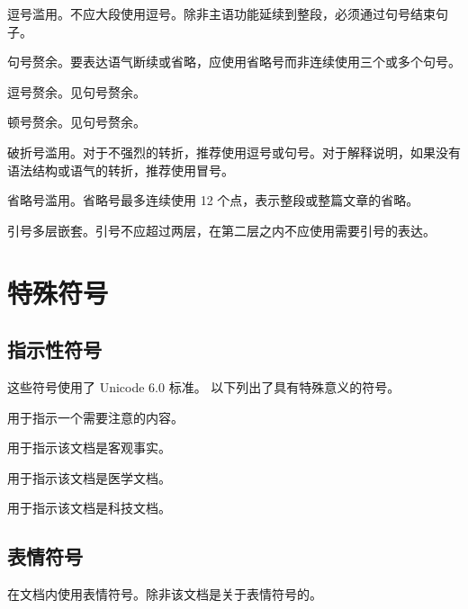 \documentclass{fo-article}
\begin{document}
\li
\item 逗号滥用。不应大段使用逗号。除非主语功能延续到整段，必须通过句号结束句子。
\item 句号赘余。要表达语气断续或省略，应使用省略号而非连续使用三个或多个句号。
\item 逗号赘余。见句号赘余。
\item 顿号赘余。见句号赘余。
\item 破折号滥用。对于不强烈的转折，推荐使用逗号或句号。对于解释说明，如果没有语法结构或语气的转折，推荐使用冒号。
\item 省略号滥用。省略号最多连续使用 12 个点，表示整段或整篇文章的省略。
\item 引号多层嵌套。引号不应超过两层，在第二层之内不应使用需要引号的表达。
\lix

\section{特殊符号}

\subsection{指示性符号}

这些符号使用了 Unicode 6.0 标准。
以下列出了具有特殊意义的符号。

\desc
\item [\warning] 用于指示一个需要注意的内容。
\item [\infpaper] 用于指示该文档是客观事实。
\item [\medics] 用于指示该文档是医学文档。
\item [\technology] 用于指示该文档是科技文档。
\descx

\subsection{表情符号}

在文档内使用表情符号。除非该文档是关于表情符号的。
\end{document}
